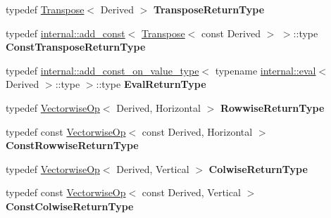 \begin{DoxyCompactItemize}
\item 
\mbox{\label{class_eigen_1_1_dense_base_a958c42582382e4bec8f58d380e277e45}} 
typedef \mbox{\hyperlink{class_eigen_1_1_transpose}{Transpose}}$<$ Derived $>$ {\bfseries Transpose\+Return\+Type}
\item 
\mbox{\label{class_eigen_1_1_dense_base_a58d9aa902b22d56dc68014d15ac36d2a}} 
typedef \mbox{\hyperlink{struct_eigen_1_1internal_1_1add__const}{internal\+::add\+\_\+const}}$<$ \mbox{\hyperlink{class_eigen_1_1_transpose}{Transpose}}$<$ const Derived $>$ $>$\+::type {\bfseries Const\+Transpose\+Return\+Type}
\item 
\mbox{\label{class_eigen_1_1_dense_base_a564801c8889b89e2b02a8872b0a3d0eb}} 
typedef \mbox{\hyperlink{struct_eigen_1_1internal_1_1add__const__on__value__type}{internal\+::add\+\_\+const\+\_\+on\+\_\+value\+\_\+type}}$<$ typename \mbox{\hyperlink{struct_eigen_1_1internal_1_1eval}{internal\+::eval}}$<$ Derived $>$\+::type $>$\+::type {\bfseries Eval\+Return\+Type}
\item 
\mbox{\label{class_eigen_1_1_dense_base_a45e67608607905de9f335661fae4c1a2}} 
typedef \mbox{\hyperlink{class_eigen_1_1_vectorwise_op}{Vectorwise\+Op}}$<$ Derived, Horizontal $>$ {\bfseries Rowwise\+Return\+Type}
\item 
\mbox{\label{class_eigen_1_1_dense_base_af3f26a9a37c53e444cba128a175a8222}} 
typedef const \mbox{\hyperlink{class_eigen_1_1_vectorwise_op}{Vectorwise\+Op}}$<$ const Derived, Horizontal $>$ {\bfseries Const\+Rowwise\+Return\+Type}
\item 
\mbox{\label{class_eigen_1_1_dense_base_a5d3c60a2c900d52930a2630fff2d7847}} 
typedef \mbox{\hyperlink{class_eigen_1_1_vectorwise_op}{Vectorwise\+Op}}$<$ Derived, Vertical $>$ {\bfseries Colwise\+Return\+Type}
\item 
\mbox{\label{class_eigen_1_1_dense_base_a86588301ac5c062a63c68dff9349ccab}} 
typedef const \mbox{\hyperlink{class_eigen_1_1_vectorwise_op}{Vectorwise\+Op}}$<$ const Derived, Vertical $>$ {\bfseries Const\+Colwise\+Return\+Type}
\item 

\end{DoxyCompactItemize}
